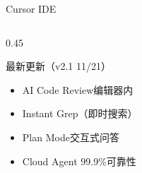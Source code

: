\documentclass[aspectratio=169,11pt]{beamer}
\begin{document}
\begin{frame}{Cursor IDE}
\begin{columns}
\begin{column}{0.45\textwidth}
            \vspace{0.3cm}
            \begin{alertblock}{最新更新（v2.1 11/21）}
                \begin{itemize}
                    \item AI Code Review编辑器内
                    \item Instant Grep（即时搜索）
                    \item Plan Mode交互式问答
                    \item Cloud Agent 99.9\%可靠性
                \end{itemize}
            \end{alertblock}
        \end{column}
    \end{columns}
\end{frame}
\end{document}
